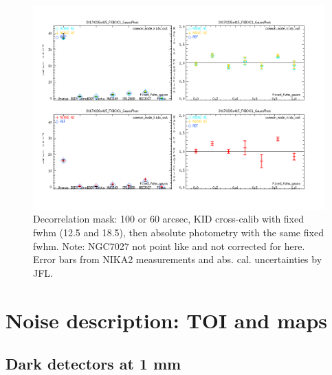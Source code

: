\documentclass[a4paper, 11pt]{article} %
\begin{document}
\begin{figure}
\begin{center}
\includegraphics[clip, angle=0, scale = 0.4]{Figures/Calibrators_N2R9_20170226s415_FXDC0C1_GaussPhotFluxType_fixed_fwhm_gauss.png}
\caption{Decorrelation mask: 100 or 60 arcsec, KID cross-calib with fixed fwhm
  (12.5 and 18.5), then absolute photometry with the same fixed fwhm. Note:
  NGC7027 not point like and not corrected for here. Error bars from NIKA2
  measurements and abs. cal. uncertainties by JFL.}
\label{fig:fov}
\end{center}
\end{figure}






\clearpage
\section{Noise description: TOI and maps}
\label{se:noise}

\subsection{Dark detectors at 1 mm}
\end{document}
